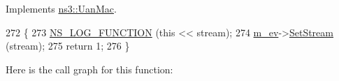 Implements \hyperlink{classns3_1_1UanMac_a903c2313ccb53edb49fb7b97c1417684}{ns3\+::\+Uan\+Mac}.


\begin{DoxyCode}
272 \{
273   \hyperlink{log-macros-disabled_8h_a90b90d5bad1f39cb1b64923ea94c0761}{NS\_LOG\_FUNCTION} (\textcolor{keyword}{this} << stream);
274   \hyperlink{classns3_1_1UanMacRc_a46cd1ac54e4a0aa4278ee162e9fdb0d5}{m\_ev}->\hyperlink{classns3_1_1RandomVariableStream_add11aaf975607746b7e271d300659a94}{SetStream} (stream);
275   \textcolor{keywordflow}{return} 1;
276 \}
\end{DoxyCode}


Here is the call graph for this function\+:


